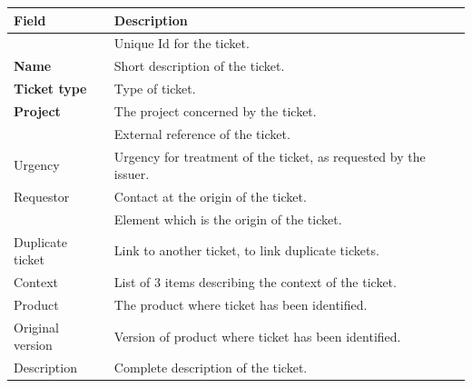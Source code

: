 \documentclass[letterpaper,10pt,english]{sphinxmanual}
\begin{document}
\begin{tabulary}{\linewidth}{|l|l|}
\hline
\textsf{\relax 
Field
} & \textsf{\relax 
Description
}\\
\hline
{\hyperref[Glossary:term-id]{\emph{}}}
 & 
Unique Id for the ticket.
\\
\hline
\textbf{Name}
 & 
Short description of the ticket.
\\
\hline
\textbf{Ticket type}
 & 
Type of ticket.
\\
\hline
\textbf{Project}
 & 
The project concerned by the ticket.
\\
\hline
{\hyperref[Glossary:term-external-reference]{\emph{}}}
 & 
External reference of the ticket.
\\
\hline
Urgency
 & 
Urgency for treatment of the ticket, as requested by the issuer.
\\
\hline
Requestor
 & 
Contact at the origin of the ticket.
\\
\hline
{\hyperref[Glossary:term-origin]{\emph{}}}
 & 
Element which is the origin of the ticket.
\\
\hline
Duplicate ticket
 & 
Link to another ticket, to link duplicate tickets.
\\
\hline
Context
 & 
List of 3 items describing the context of the ticket.
\\
\hline
Product
 & 
The product where ticket has been identified.
\\
\hline
Original version
 & 
Version of product where ticket has been identified.
\\
\hline
Description
 & 
Complete description of the ticket.
\\
\hline\end{tabulary}
\end{document}
